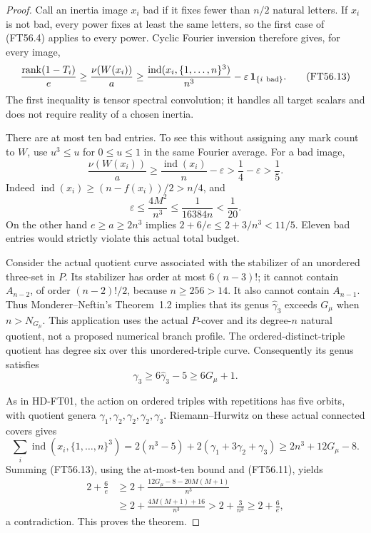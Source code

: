 \begin{proof}
Call an inertia image \(x_i\) bad if it fixes fewer than \(n/2\)
natural letters.  If \(x_i\) is not bad, every power fixes at least
the same letters, so the first case of (FT56.4) applies to every power.
Cyclic Fourier inversion therefore gives, for every image,
\[
 \frac{\operatorname{rank}(1-T_i)}e
 \ge\frac{\nu(W(x_i))}{a}
 \ge\frac{\operatorname{ind}(x_i,\{1,\ldots,n\}^3)}{n^3}
                    -\varepsilon\,{\bf1}_{\{i\ {\rm bad}\}}.
 \tag{FT56.13}
\]
The first inequality is tensor spectral convolution; it handles
all target scalars and does not require reality of a chosen inertia.

There are at most ten bad entries.  To see this without assigning
any mark count to \(W\), use \(u^3\le u\) for \(0\le u\le1\)
in the same Fourier average.  For a bad image,
\[
 \frac{\nu(W(x_i))}{a}
 \ge\frac{\operatorname{ind}(x_i)}n-\varepsilon
 >\frac14-\varepsilon>\frac15.
 \tag{FT56.14}
\]
Indeed \(\operatorname{ind}(x_i)\ge(n-f(x_i))/2>n/4\), and
\[
 \varepsilon\le\frac{4M^2}{n^3}
       \le\frac1{16384n}<\frac1{20}.
 \tag{FT56.15}
\]
On the other hand \(e\ge a\ge2n^3\) implies
\(2+6/e\le2+3/n^3<11/5\).
Eleven bad entries would strictly violate this actual total budget.

Consider the actual quotient curve associated with the stabilizer
of an unordered three-set in \(P\).  Its stabilizer has order at
most \(6(n-3)!\); it cannot contain \(A_{n-2}\), of order
\((n-2)!/2\), because \(n\ge256>14\).
It also cannot contain \(A_{n-1}\).
Thus Monderer--Neftin's Theorem~1.2 implies that its genus
\(\widehat\gamma_3\) exceeds \(G_\mu\) when \(n>N_{G_\mu}\).
This application uses the actual \(P\)-cover and its degree-\(n\)
natural quotient, not a proposed numerical branch profile.
The ordered-distinct-triple quotient has degree six over this
unordered-triple curve.  Consequently its genus satisfies
\[
 \gamma_3\ge6\widehat\gamma_3-5\ge6G_\mu+1.
 \tag{FT56.16}
\]

As in HD-FT01, the action on ordered triples with repetitions
has five orbits, with quotient genera
\(\gamma_1,\gamma_2,\gamma_2,\gamma_2,\gamma_3\).
Riemann--Hurwitz on these actual connected covers gives
\[
 \sum_i\operatorname{ind}(x_i,\{1,\ldots,n\}^3)
 =2(n^3-5)+2(\gamma_1+3\gamma_2+\gamma_3)
 \ge2n^3+12G_\mu-8.
 \tag{FT56.17}
\]
Summing (FT56.13), using the at-most-ten bound and (FT56.11), yields
\[
 \begin{split}
 2+\frac6e
 &\ge 2+\frac{12G_\mu-8-20M(M+1)}{n^3}\\
 &\ge 2+\frac{4M(M+1)+16}{n^3}
  >2+\frac3{n^3}\ge2+\frac6e,
 \end{split}
 \tag{FT56.18}
\]
a contradiction.  This proves the theorem.
\end{proof}

